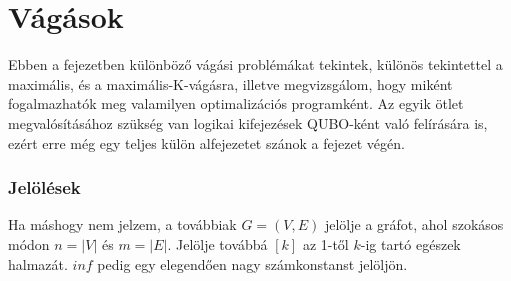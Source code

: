 
\chapter{Vágások}


Ebben a fejezetben különböző vágási problémákat tekintek, különös tekintettel a maximális, és a maximális-K-vágásra, illetve megvizsgálom, hogy miként fogalmazhatók meg valamilyen optimalizációs programként. Az egyik ötlet megvalósításához szükség van logikai kifejezések QUBO-ként való felírására is, ezért erre még egy teljes külön alfejezetet szánok a fejezet végén.

\subsection{Jelölések}
Ha máshogy nem jelzem, a továbbiak $G=(V,E)$ jelölje a gráfot, ahol szokásos módon $n=|V|$ és $m=|E|$. Jelölje továbbá $[k]$ az 1-től $k$-ig tartó egészek halmazát. $inf$ pedig egy elegendően nagy számkonstanst jelöljön.

